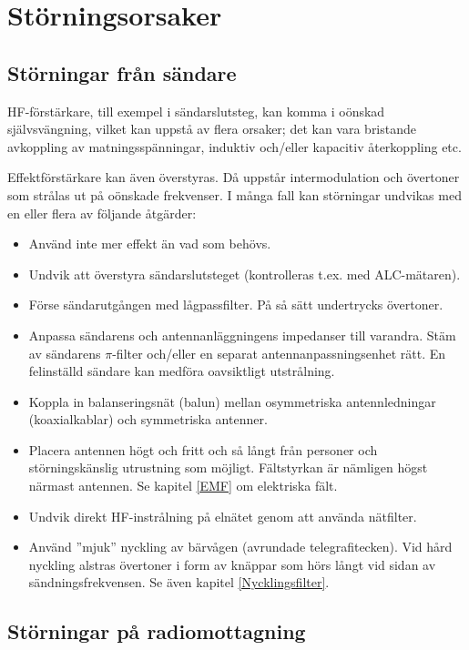 \section{Störningsorsaker}
\label{Störningsorsaker}
\subsection{Störningar från sändare}

HF-förstärkare, till exempel i sändarslutsteg, kan komma i oönskad självsvängning,
vilket kan uppstå av flera orsaker; det kan vara bristande avkoppling av
matningsspänningar, induktiv och/eller kapacitiv återkoppling etc.

Effektförstärkare kan även överstyras.
Då uppstår intermodulation och övertoner som strålas ut på oönskade frekvenser.
I många fall kan störningar undvikas med en eller flera av följande åtgärder:

\begin{itemize}
\item Använd inte mer effekt än vad som behövs.
\item Undvik att överstyra sändarslutsteget (kontrolleras t.ex. med
  ALC-mätaren).
\item Förse sändarutgången med lågpassfilter.
  På så sätt undertrycks övertoner.
\item Anpassa sändarens och antennanläggningens impedanser till varandra.
  Stäm av sändarens \(\pi\)-filter och/eller en separat antennanpassningsenhet
  rätt.
  En felinställd sändare kan medföra oavsiktligt utstrålning.
\item Koppla in balanseringsnät (balun) mellan osymmetriska antennledningar
  (koaxialkablar) och symmetriska antenner.
\item Placera antennen högt och fritt och så långt från personer och
  störningskänslig utrustning som möjligt.
  Fältstyrkan är nämligen högst närmast antennen.
  Se kapitel \ref{EMF} om elektriska fält.
\item Undvik direkt HF-instrålning på elnätet genom att använda nätfilter.
\item Använd ''mjuk'' nyckling av bärvågen (avrundade telegrafitecken).
  Vid hård nyckling alstras övertoner i form av knäppar som hörs långt vid
  sidan av sändningsfrekvensen. Se även kapitel \ref{Nycklingsfilter}.
\end{itemize}

\subsection{Störningar på radiomottagning}

